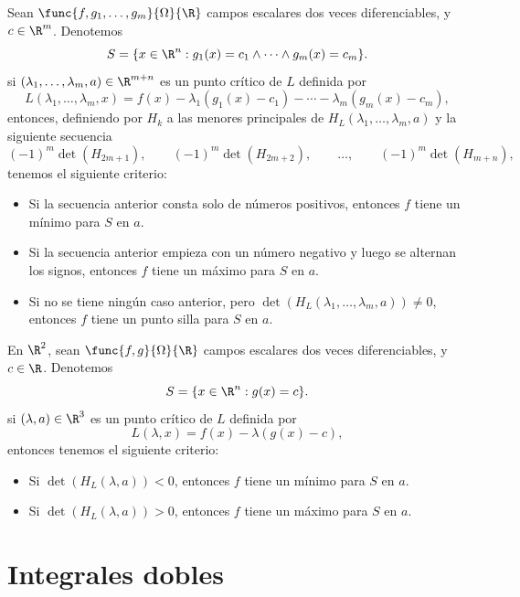 \documentclass[a4,11pt]{aleph-notas}
\begin{document}
\begin{teo}
    Sean $\func{f,g_1,\ldots,g_m}{\Omega}{\R}$ campos escalares dos veces diferenciables, y $c\in \R^m$. Denotemos 
    \[
        S =  \{x\in \R^n: g_1(x)=c_1\land\cdots\land g_m(x)=c_m\}.
    \]
    si  $(\lambda_1,\ldots,\lambda_m,a)\in\R^{m+n}$ es un punto crítico de $L$ definida por
    \[
        L(\lambda_1,\ldots,\lambda_m,x) = f(x) - \lambda_1 (g_1(x)-c_1) - \cdots
        - \lambda_m (g_m(x)-c_m),
    \]
    entonces, definiendo por $H_k$ a las menores principales de $H_L(\lambda_1,\ldots,\lambda_m,a)$ y la siguiente secuencia
    \[
        (-1)^m\det(H_{2m+1}),\qquad
        (-1)^m\det(H_{2m+2}),\qquad
        \ldots,\qquad
        (-1)^m\det(H_{m+n}),
    \]
    tenemos el siguiente criterio: 
    \begin{itemize}
        \item Si la secuencia anterior consta solo de números positivos, entonces $f$ tiene un mínimo para $S$ en $a$.
        \item Si la secuencia anterior empieza con un número negativo y luego se alternan los signos, entonces $f$ tiene un máximo para $S$ en $a$.
        \item Si no se tiene ningún caso anterior, pero $\det(H_L(\lambda_1,\ldots,\lambda_m,a))\neq 0$, entonces $f$ tiene un punto silla para $S$ en $a$.
    \end{itemize}
\end{teo}
 

\begin{teo}
    En $\R^2$, sean $\func{f,g}{\Omega}{\R}$ campos escalares dos veces diferenciables, y $c\in \R$. Denotemos 
    \[
        S =  \{x\in \R^n: g(x)=c\}.
    \]
    si  $(\lambda,a)\in\R^{3}$ es un punto crítico de $L$ definida por
    \[
        L(\lambda,x) = f(x) - \lambda (g(x)-c) ,
    \]
    entonces tenemos el siguiente criterio: 
    \begin{itemize}
        \item Si $\det(H_L(\lambda,a))<0$, entonces $f$ tiene un mínimo para $S$ en $a$.
        \item Si $\det(H_L(\lambda,a))>0$, entonces $f$ tiene un máximo para $S$ en $a$.
    \end{itemize}
\end{teo}

\section{Integrales dobles}
\end{document}
